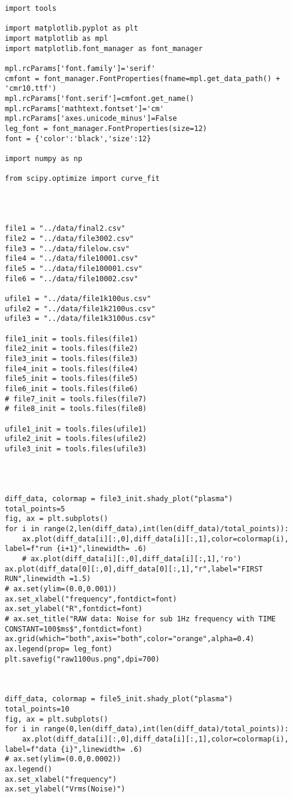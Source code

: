 \begin{verbatim}
import tools

import matplotlib.pyplot as plt
import matplotlib as mpl
import matplotlib.font_manager as font_manager

mpl.rcParams['font.family']='serif'
cmfont = font_manager.FontProperties(fname=mpl.get_data_path() + 'cmr10.ttf')
mpl.rcParams['font.serif']=cmfont.get_name()
mpl.rcParams['mathtext.fontset']='cm'
mpl.rcParams['axes.unicode_minus']=False
leg_font = font_manager.FontProperties(size=12)
font = {'color':'black','size':12}

import numpy as np

from scipy.optimize import curve_fit




file1 = "../data/final2.csv"
file2 = "../data/file3002.csv"
file3 = "../data/filelow.csv"
file4 = "../data/file10001.csv"
file5 = "../data/file100001.csv"
file6 = "../data/file10002.csv"

ufile1 = "../data/file1k100us.csv"
ufile2 = "../data/file1k2100us.csv"
ufile3 = "../data/file1k3100us.csv"

file1_init = tools.files(file1)
file2_init = tools.files(file2)
file3_init = tools.files(file3)
file4_init = tools.files(file4)
file5_init = tools.files(file5)
file6_init = tools.files(file6)
# file7_init = tools.files(file7)
# file8_init = tools.files(file8)

ufile1_init = tools.files(ufile1)
ufile2_init = tools.files(ufile2)
ufile3_init = tools.files(ufile3)




diff_data, colormap = file3_init.shady_plot("plasma")
total_points=5
fig, ax = plt.subplots()
for i in range(2,len(diff_data),int(len(diff_data)/total_points)):
    ax.plot(diff_data[i][:,0],diff_data[i][:,1],color=colormap(i), label=f"run {i+1}",linewidth= .6)
    # ax.plot(diff_data[i][:,0],diff_data[i][:,1],'ro')
ax.plot(diff_data[0][:,0],diff_data[0][:,1],"r",label="FIRST RUN",linewidth =1.5)
# ax.set(ylim=(0.0,0.001))
ax.set_xlabel("frequency",fontdict=font)
ax.set_ylabel("R",fontdict=font)
# ax.set_title("RAW data: Noise for sub 1Hz frequency with TIME CONSTANT=100$ms$",fontdict=font)
ax.grid(which="both",axis="both",color="orange",alpha=0.4)
ax.legend(prop= leg_font)
plt.savefig("raw1100us.png",dpi=700)



diff_data, colormap = file5_init.shady_plot("plasma")
total_points=10
fig, ax = plt.subplots()
for i in range(0,len(diff_data),int(len(diff_data)/total_points)):
    ax.plot(diff_data[i][:,0],diff_data[i][:,1],color=colormap(i), label=f"data {i}",linewidth= .6)
# ax.set(ylim=(0.0,0.0002))
ax.legend()
ax.set_xlabel("frequency")
ax.set_ylabel("Vrms(Noise)")



\end{verbatim}
